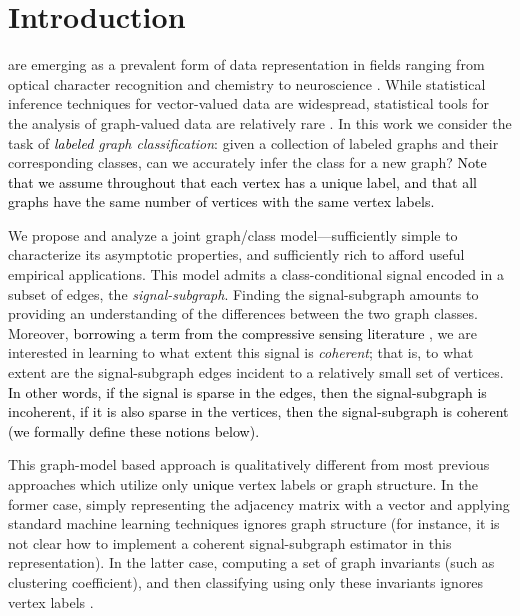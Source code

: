 \documentclass[10pt,journal,cspaper,compsoc]{IEEEtran}
\providecommand{\tk}[1]{\textcolor{black}{#1}}
\newcommand{\comment}[1]{}
\begin{document}
\maketitle
\IEEEdisplaynotcompsoctitleabstractindextext
\IEEEpeerreviewmaketitle



\section{Introduction} \label{sec:intro}

 are emerging as a prevalent form of data representation in fields ranging from optical character recognition and chemistry \cite{Bunke2011} to neuroscience \cite{Hagmann2010}.  While statistical inference techniques for vector-valued data are widespread, statistical tools for the analysis of graph-valued data are relatively rare \cite{Bunke2011}. In this work we consider the task of \emph{\tk{labeled} graph classification}: given a collection of labeled graphs and their corresponding class\tk{es}\comment{labels}, can we accurately infer the class \comment{label} for a new graph?  \tk{Note that we assume throughout that each vertex has a unique label, and that all graphs have the same number of vertices with the same vertex labels.}

We propose and analyze a joint graph/class model---sufficiently simple to characterize its asymptotic properties, and sufficiently rich to afford useful empirical applications.  This model admits a class-conditional signal encoded in a subset of edges, the \emph{signal-subgraph}. Finding the signal-subgraph amounts to providing an understanding of the differences between the two graph classes.  Moreover,
\tk{borrowing a term from the compressive sensing literature \cite{Donoho2006, Candes2008}}, 
 we are interested in learning to what extent this signal is \emph{coherent}; that is, to what extent are the signal-subgraph edges incident to a relatively small set of vertices. \tk{In other words, if the signal is sparse in the edges, then the signal-subgraph is incoherent, if it is also sparse in the vertices, then the signal-subgraph is coherent (we formally define these notions below).} \comment{If the signal-subgraph is strongly coherent, this suggests that the signal is carried by a few important vertices in the graph; otherwise, the signal is more widely distributed across the graph, with no particularly special vertices. }

This graph-model based approach is qualitatively different from most previous approaches which utilize only \tk{unique} vertex labels or graph structure.  In the former case, simply representing the adjacency matrix with a vector and applying standard machine learning techniques ignores graph structure (for instance, it is not clear how to implement a coherent signal-subgraph estimator in this representation).  In the latter case, computing a set of graph invariants (such as clustering coefficient), and then classifying using only these invariants ignores vertex labels \tk{\cite{Kudo2005,Ketkar2009,Bunke2011}}.  \comment{Neither of these approaches use both vertex labels and graph structure.}  
\end{document}
